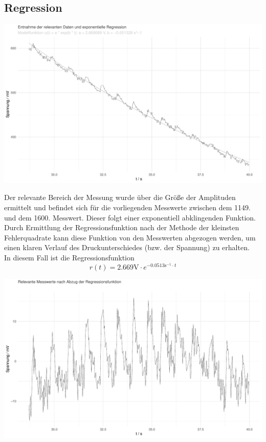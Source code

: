 \documentclass{article}
\begin{document}
\subsection{Regression}

\includegraphics[width=\textwidth]{graphics/regression.pdf}

Der relevante Bereich der Messung wurde über die Größe der \glqq Amplituden \grqq ermittelt und befindet sich für die vorliegenden Messwerte zwischen dem 1149. und dem 1600. Messwert. Dieser folgt einer exponentiell abklingenden Funktion. Durch Ermittlung der Regressionsfunktion nach der Methode der kleinsten Fehlerquadrate kann diese Funktion von den Messwerten abgezogen werden, um einen klaren Verlauf des Druckunterschiedes (bzw. der Spannung) zu erhalten.\\

In diesem Fall ist die Regressionsfunktion
\[r(t) = 2.669 \si{\volt} \cdot e^{-0.0513 \si{\second}^{-1} \cdot t}\]

\includegraphics[width=\textwidth]{graphics/extraction.pdf}
\end{document}

